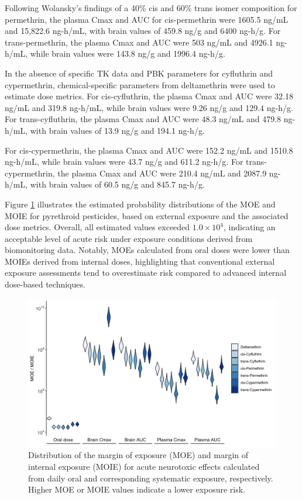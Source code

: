 \documentclass[toxics,article,submit,pdftex,moreauthors]{Definitions/mdpi}
\begin{document}
Following Wolansky's findings of a 40\% cis and 60\% trans isomer
composition for permethrin, the plasma Cmax and AUC for cis-permethrin
were 1605.5 ng/mL and 15,822.6 ng-h/mL, with brain values of 459.8 ng/g
and 6400 ng-h/g. For trans-permethrin, the plasma Cmax and AUC were 503
ng/mL and 4926.1 ng-h/mL, while brain values were 143.8 ng/g and 1996.4
ng-h/g.

In the absence of specific TK data and PBK parameters
for cyfluthrin and cypermethrin, chemical-specific parameters from
deltamethrin were used to estimate dose metrics. For cis-cyfluthrin, the
plasma Cmax and AUC were 32.18 ng/mL and 319.8 ng-h/mL, while brain
values were 9.26 ng/g and 129.4 ng-h/g. For trans-cyfluthrin, the plasma
Cmax and AUC were 48.3 ng/mL and 479.8 ng-h/mL, with brain values of
13.9 ng/g and 194.1 ng-h/g.

For cis-cypermethrin, the plasma Cmax and AUC were 152.2 ng/mL and
1510.8 ng-h/mL, while brain values were 43.7 ng/g and 611.2 ng-h/g. For
trans-cypermethrin, the plasma Cmax and AUC were 210.4 ng/mL and 2087.9
ng-h/mL, with brain values of 60.5 ng/g and 845.7 ng-h/g.

Figure \ref{fig:fig8} illustrates the estimated probability
distributions of the MOE and MOIE for pyrethroid pesticides, based on
external exposure and the associated dose metrics. Overall, all
estimated values exceeded \(1.0 \times 10^{4}\), indicating an
acceptable level of acute risk under exposure conditions derived from
biomonitoring data. Notably, MOEs calculated from oral doses were lower
than MOIEs derived from internal doses, highlighting that conventional
external exposure assessments tend to overestimate risk compared to
advanced internal dose-based techniques.

\begin{figure}[H]
\includegraphics[width=1\linewidth,]{figures/fig8} \caption{Distribution of the margin of exposure (MOE) and margin of internal exposure (MOIE) for acute neurotoxic effects calculated from daily oral and corresponding systematic exposure, respectively. Higher MOE or MOIE values indicate a lower exposure risk.}\label{fig:fig8}
\end{figure}
\end{document}
